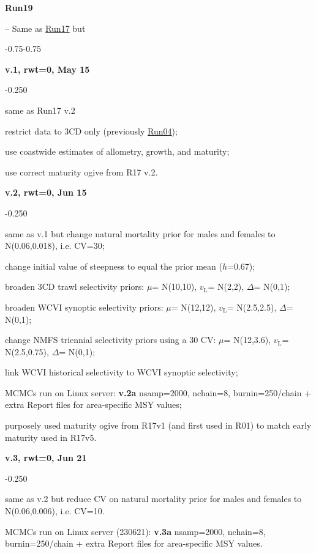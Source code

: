 \hypertarget{R19}{\textbf{Run19}} -- Same as \hyperlink{R17}{Run17} but
\begin{itemize_csas}{-0.75}{-0.75}
	\item \textbf{v.1, rwt=0, May 15}
	\begin{itemize_csas}{-0.25}{0}
		\item same as Run17 v.2
		\item restrict data to 3CD only (previously \hyperlink{R04}{Run04});
		\item use coastwide estimates of allometry, growth, and maturity;
		\item use correct maturity ogive from R17 v.2.
	\end{itemize_csas}
	\item \textbf{v.2, rwt=0, Jun 15}
	\begin{itemize_csas}{-0.25}{0}
		\item same as v.1 but change natural mortality prior for males and females to N(0.06,0.018), i.e. CV=30\pc{};
		\item change initial value of steepness to equal the prior mean ($h$=0.67);
		\item broaden 3CD trawl selectivity priors: $\mu$= N(10,10), $v_\text{L}$= N(2,2), $\Delta$= N(0,1);
		\item broaden WCVI synoptic selectivity priors: $\mu$= N(12,12), $v_\text{L}$= N(2.5,2.5), $\Delta$= N(0,1);
		\item change NMFS triennial selectivity priors using a 30\pc{} CV: $\mu$= N(12,3.6), $v_\text{L}$= N(2.5,0.75), $\Delta$= N(0,1);
		\item link WCVI historical selectivity to WCVI synoptic selectivity;
		\item MCMCs run on Linux server: \textbf{v.2a} nsamp=2000, nchain=8, burnin=250/chain + extra Report files for area-specific MSY values;
		\item \alert{purposely used maturity ogive from R17v1 (and first used in R01) to match early maturity used in R17v5.}
	\end{itemize_csas}
	\item \textbf{v.3, rwt=0, Jun 21}
	\begin{itemize_csas}{-0.25}{0}
		\item same as v.2 but reduce CV on natural mortality prior for males and females to N(0.06,0.006), i.e. CV=10\pc{}.
		\item MCMCs run on Linux server (230621): \textbf{v.3a} nsamp=2000, nchain=8, burnin=250/chain + extra Report files for area-specific MSY values.

\end{itemize_csas}
\end{itemize_csas}
